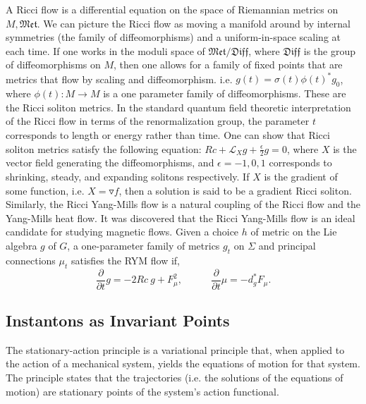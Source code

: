 \documentclass{article}
\begin{document}
    A Ricci flow is a differential equation on the space of Riemannian metrics on $M, \mathfrak{Met}$. We can picture the Ricci flow as moving a manifold around by internal symmetries (the family of diffeomorphisms) and a uniform-in-space scaling at each time. If one works in the moduli space of $\mathfrak{Met}/ \mathfrak{Diff}$, where $\mathfrak{Diff}$ is the group of diffeomorphisms on $M$, then one allows for a family of fixed points that are metrics that flow by scaling and diffeomorphism. i.e. $g(t) = \sigma (t) \phi (t) ^* g_0$,
    where $\phi(t) :M \rightarrow M$ is a one parameter family of diffeomorphisms. 
    These are the Ricci soliton metrics. 
    In the standard quantum field theoretic interpretation of the Ricci flow in terms of the renormalization group, the parameter $t$ corresponds to length or energy rather than time.
    One can show that Ricci soliton metrics satisfy the following equation: $Rc+\mathcal{L}_X g+ 
    \frac{\epsilon}{2} g = 0$, where $X$ is the vector field generating the diffeomorphisms, and $\epsilon = -1,0,1$ corresponds to shrinking, steady, and expanding solitons respectively. If $X$ is the gradient of some function, i.e. $X=\triangledown f$, then a solution is said to be a gradient Ricci soliton. 
    Similarly, the Ricci Yang-Mills flow is a natural coupling of the Ricci flow and the Yang-Mills heat flow. It was discovered that the Ricci Yang-Mills flow is an ideal candidate for studying magnetic flows. Given a choice $h$ of metric on the Lie algebra $g$ of $G$, a one-parameter family of metrics $g_t$ on $\Sigma$ and principal connections $\mu_t$ satisfies the RYM flow if, 
    \begin{equation}
        \frac{\partial}{\partial t} g = -2 Rc \ g + F^2_\mu,  \ \ \ \ \ \ \ \ \ \ \ \ \ 
        \frac{\partial}{\partial t}\mu = -d^*_gF_\mu .
    \end{equation}
    
    \subsection{Instantons as Invariant Points}
    The stationary-action principle is a variational principle that, when applied to the action of a mechanical system, yields the equations of motion for that system. The principle states that the trajectories (i.e. the solutions of the equations of motion) are stationary points of the system's action functional.
    
\end{document}
